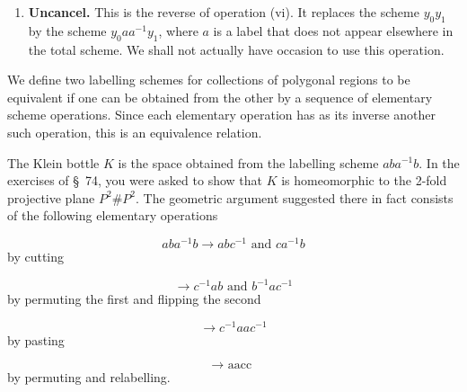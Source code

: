 \begin{enumerate}[itemsep=0.2em, parsep=0pt, topsep=0pt, partopsep=0pt, leftmargin=*, label=(\roman*), align=left]
[Figure 76.3]
\item \textbf{Uncancel.} This is the reverse of operation (vi). It replaces the scheme \(y_{0}y_{1}\) by the scheme \(y_{0}aa^{-1}y_{1}\), where \(a\) is a label that does not appear elsewhere in the total scheme. We shall not actually have occasion to use this operation.
\end{enumerate}

\begin{definition}
	We define two labelling schemes for collections of polygonal regions to be equivalent if one can be obtained from the other by a sequence of elementary scheme operations. Since each elementary operation has as its inverse another such operation, this is an equivalence relation.
\end{definition}

\begin{centeredblock*}
\begin{example}
\label{ex:\thesection.\theexample}
	The Klein bottle \(K\) is the space obtained from the labelling scheme \({ab}a^{-1}b\). In the exercises of \S\ 74, you were asked to show that \(K\) is homeomorphic to the 2-fold projective plane \(P^{2}\# P^{2}\). The geometric argument suggested there in fact consists of the following elementary operations

\[
{ab}a^{-1}b \rightarrow {ab}c^{-1}\text{ and }ca^{-1}b
\]
by cutting

\[
\rightarrow {c}^{-1}{ab}\text{ and }b^{-1}ac^{-1}
\]
by permuting the first and flipping the second

\[
\rightarrow {c}^{-1}{aa}c^{-1}
\]
by pasting

\[
\rightarrow \text{ aacc }
\]
by permuting and relabelling.
\end{example}
\end{centeredblock*}

